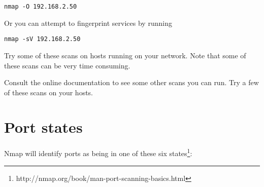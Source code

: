 \documentclass{article}
\begin{document}
\texttt{nmap -O 192.168.2.50}

Or you can attempt to fingerprint services by running

\texttt{nmap -sV 192.168.2.50}


Try some of these scans on hosts running on your network.  Note that some of these scans can be very time consuming.

Consult the online documentation to see some other scans you can run. Try a few of these scans on your hosts.

\section{Port states}
Nmap will identify ports as being in one of these six states\footnote{http://nmap.org/book/man-port-scanning-basics.html}:
\end{document}
